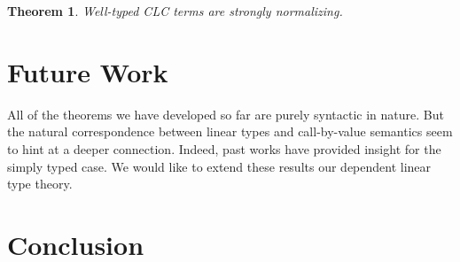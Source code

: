 \documentclass{article}
\newtheorem{theorem}{Theorem}[section]
\theoremstyle{definition}
\begin{document}
  \begin{theorem}
    Well-typed CLC terms are strongly normalizing.
  \end{theorem}

  \section{Future Work}
  All of the theorems we have developed so far are purely syntactic in nature. But the natural correspondence between linear types and call-by-value semantics seem to hint at a deeper connection. Indeed, past works\cite{cbvsemantics} have provided insight for the simply typed case. We would like to extend these results our dependent linear type theory. 
  \section{Conclusion}



\end{document}
